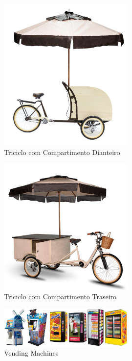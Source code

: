 \begin{figure}[H]
	\centering
    \includegraphics[width=0.6\textwidth]{figuras/exemplo2}
    \caption{Triciclo com Compartimento Dianteiro}
    \label{fig:exemplo2}
\end{figure}

\begin{figure}[H]
	\centering
    \includegraphics[width=0.6\textwidth]{figuras/exemplo}
    \caption{Triciclo com Compartimento Traseiro}
    \label{fig:exemplo}
\end{figure}

\begin{figure}[H]
	\centering
    \includegraphics[width=0.6\textwidth]{figuras/machinewrapsheader}
    \caption{Vending Machines}
    \label{fig:machinewrapsheader}
\end{figure}


